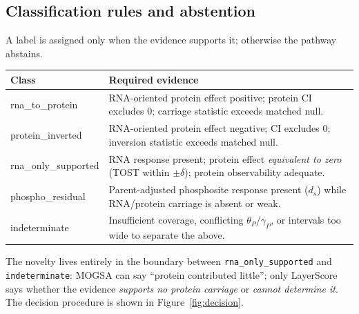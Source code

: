 \documentclass[11pt]{article}
\newcommand{\Crna}{\texttt{rna\_only\_supported}}
\newcommand{\Cind}{\texttt{indeterminate}}
\begin{document}
\subsection{Classification rules and abstention}\label{sec:rules}
A label is assigned only when the evidence supports it; otherwise the pathway abstains.
\begin{center}\small
\renewcommand{\arraystretch}{1.25}
\begin{tabularx}{\textwidth}{@{}>{\ttfamily\footnotesize}p{3.0cm} L@{}}
\toprule
\normalfont\textbf{Class} & \textbf{Required evidence} \\
\midrule
rna\_to\_protein & RNA-oriented protein effect positive; protein CI excludes $0$; carriage statistic exceeds matched null. \\
protein\_inverted & RNA-oriented protein effect negative; CI excludes $0$; inversion statistic exceeds matched null. \\
rna\_only\_supported & RNA response present; protein effect \emph{equivalent to zero} (TOST within $\pm\delta$); protein observability adequate. \\
phospho\_residual & Parent-adjusted phosphosite response present ($d_s$) while RNA/protein carriage is absent or weak. \\
indeterminate & Insufficient coverage, conflicting $\theta_P$/$\gamma_P$, or intervals too wide to separate the above. \\
\bottomrule
\end{tabularx}
\end{center}
\noindent The novelty lives entirely in the boundary between \Crna{} and \Cind{}: MOGSA can say ``protein
contributed little''; only LayerScore says whether the evidence \emph{supports no protein carriage} or
\emph{cannot determine it}. The decision procedure is shown in Figure~\ref{fig:decision}.
\end{document}
